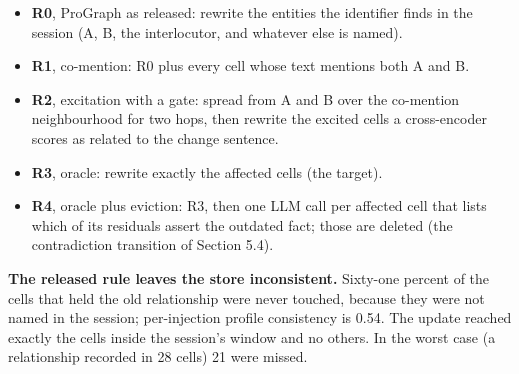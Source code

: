 \documentclass[11pt]{article}
\begin{document}
\begin{itemize}
\item \textbf{R0}, ProGraph as released: rewrite the entities the identifier finds in the session (A, B, the interlocutor, and whatever else is named).
\item \textbf{R1}, co-mention: R0 plus every cell whose text mentions both A and B.
\item \textbf{R2}, excitation with a gate: spread from A and B over the co-mention neighbourhood for two hops, then rewrite the excited cells a cross-encoder scores as related to the change sentence.
\item \textbf{R3}, oracle: rewrite exactly the affected cells (the target).
\item \textbf{R4}, oracle plus eviction: R3, then one LLM call per affected cell that lists which of its residuals assert the outdated fact; those are deleted (the contradiction transition of Section 5.4).
\end{itemize}

\begin{table}[t]
\centering\small
\setlength{\tabcolsep}{4pt}
\caption{Propagation of a state change (12 injections, 89 affected cells).}
\end{table}

\textbf{The released rule leaves the store inconsistent.} Sixty-one percent of the cells that held the old relationship were never touched, because they were not named in the session; per-injection profile consistency is 0.54. The update reached exactly the cells inside the session's window and no others. In the worst case (a relationship recorded in 28 cells) 21 were missed.
\end{document}
